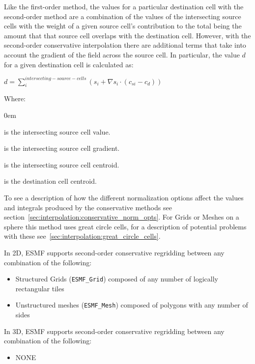 Like the first-order method, the values for a particular destination cell with the second-order method
 are a combination of the values of the intersecting source cells with the weight of a given source cell's contribution to the total 
 being the amount that that source cell overlaps with the destination cell. 
 However, with the second-order conservative interpolation there are additional terms that take into account the gradient of the field 
 across the source cell. In particular, the value $d$ for a given destination cell is calculated as:
 
 $d=\sum^{intersecting-source-cells}_{i}(s_{i}+\nabla s_{i} \cdot (c_{si}-c_{d}))$

\smallskip

Where:
\vspace{-1em}
\begin{description}
  \itemsep0em
  \item[$s_{i}$] is the intersecting source cell value. 
  \item[$\nabla s_{i}$] is the intersecting source cell gradient. 
  \item[$c_{si}$] is the intersecting source cell centroid. 
  \item[$c_{d}$] is the destination cell centroid. 
\end{description}

\smallskip

 To see a description of how the different normalization options affect the values and integrals produced by the conservative methods see section~\ref{sec:interpolation:conservative_norm_opts}. For Grids or Meshes on a sphere this method uses great circle cells, for a description of potential problems with these see~\ref{sec:interpolation:great_circle_cells}.


\smallskip

 In 2D, ESMF supports second-order conservative regridding between any combination of the following:
 \begin{itemize}
 \item Structured Grids ({\tt ESMF\_Grid}) composed of any number of logically rectangular tiles
 \item Unstructured meshes ({\tt ESMF\_Mesh}) composed of polygons with any number of sides
 \end{itemize}

\smallskip

 In 3D, ESMF supports second-order conservative regridding between any combination of the following:
 \begin{itemize}
 \item NONE
 \end{itemize}

